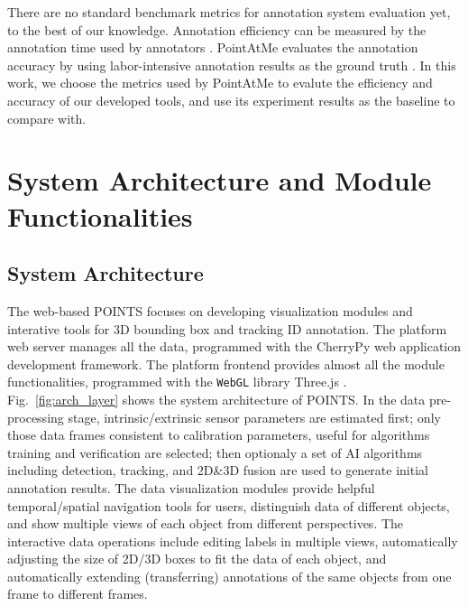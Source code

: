 \documentclass[letterpaper, 10 pt, conference]{ieeeconf}  %
\begin{document}
There are no standard benchmark metrics for annotation system evaluation yet, to the best of our knowledge.
Annotation efficiency can be measured by the annotation time used by annotators \cite{monica2017multi,pointatme,Zimmer20193DBA}. 
PointAtMe evaluates the annotation accuracy by using labor-intensive annotation results as the ground truth \cite{pointatme}. 
In this work, we choose the metrics used by PointAtMe \cite{pointatme} to evalute the efficiency and accuracy of our developed tools, 
and use its experiment results as the baseline to compare with.


\section{System Architecture and Module Functionalities}
\label{sec:systemarch}

\subsection{System Architecture}

The web-based POINTS focuses on developing visualization modules and interative tools for 3D bounding box and tracking ID annotation.
The platform web server manages all the data, programmed with the CherryPy \cite{cherrypy} web application development framework.
The platform frontend provides almost all the module functionalities, programmed with the \texttt{WebGL} library Three.js \cite{threejs}.
Fig.~\ref{fig:arch_layer} shows the system architecture of POINTS.
In the data pre-processing stage, intrinsic/extrinsic sensor parameters are estimated first; only those data frames consistent to calibration parameters, useful for algorithms training and verification are selected; then optionaly a set of AI algorithms including detection, tracking, and 2D\&3D fusion are used to generate initial annotation results. The data visualization modules provide helpful temporal/spatial navigation tools for users, distinguish data of different objects, and show multiple views of each object from different perspectives. The interactive data operations include editing labels in multiple views, automatically adjusting the size of 2D/3D boxes to fit the data of each object, and automatically extending (transferring) annotations of the same objects from one frame to different frames.
\end{document}
